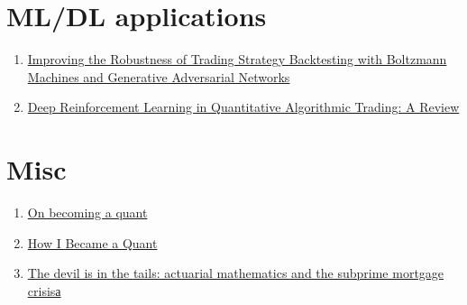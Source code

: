 \documentclass[a4paper, 12pt]{article}
\begin{document}
\section*{ML/DL applications}
\begin{enumerate}
\item \href{http://thierry-roncalli.com/download/rbm_gan_backtesting.pdf}{Improving the Robustness of Trading Strategy Backtesting with Boltzmann Machines and Generative Adversarial Networks}

\item \href{https://arxiv.org/pdf/2106.00123.pdf}{Deep Reinforcement Learning in Quantitative Algorithmic Trading: A Review}
\end{enumerate}

\section*{Misc}
\begin{enumerate}
	
	\item \href{https://www.maths.usyd.edu.au/u/UG/SM/MATH3075/r/Joshi_2008.pdf}{On becoming a quant}
	\item \href{https://engineering.nyu.edu/sites/default/files/2021-10/How_I_Became_a_Quant\%20\%281\%29.pdf}{How I Became a Quant}
	
	\item \href{http://www.macs.hw.ac.uk/~cd134/2010/donemb.pdf}{The devil is in the tails: actuarial mathematics and the subprime mortgage crisisа}
\end{enumerate}
\end{document}
